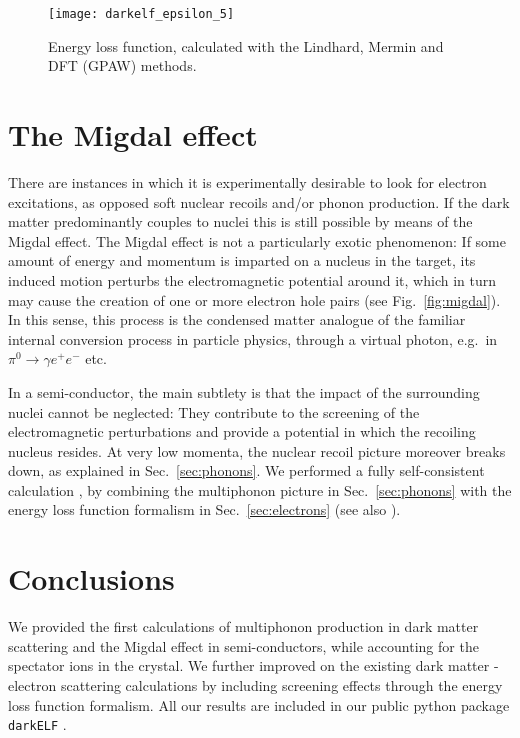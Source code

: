 \documentclass{moriond}
\begin{document}
\begin{figure}
\centerline{\texttt{[image: darkelf\_epsilon\_5]}}
\caption[]{Energy loss function, calculated with the Lindhard, Mermin and DFT (GPAW) methods.\cite{Knapen:2021run,Knapen:2021bwg}}
\label{fig:elf}
\end{figure}


\section{The Migdal effect}
There are instances in which it is experimentally desirable to look for electron excitations, as opposed soft nuclear recoils and/or phonon production. If the dark matter predominantly couples to nuclei this is still possible by means of the Migdal effect. The Migdal effect is not a particularly exotic phenomenon: If some amount of energy and momentum is imparted on a nucleus in the target, its induced motion perturbs the electromagnetic potential around it, which in turn may cause the creation of one or more electron hole pairs (see Fig.~\ref{fig:migdal}). In this sense, this process is the condensed matter analogue of the familiar internal conversion process in particle physics, through a virtual photon, e.g.~in $\pi^0 \to \gamma e^+e^-$ etc. 

In a semi-conductor, the main subtlety is that the impact of the surrounding nuclei cannot be neglected: They contribute to the screening of the electromagnetic perturbations and provide a potential in which the recoiling nucleus resides. At very low momenta, the nuclear recoil picture moreover breaks down, as explained in Sec.~\ref{sec:phonons}. We performed a fully self-consistent calculation \cite{Knapen:2020aky}, by combining the multiphonon picture in Sec.~\ref{sec:phonons} with the energy loss function formalism in Sec.~\ref{sec:electrons} (see also \cite{Liang:2020ryg,Berghaus:2022pbu}). 





\section{Conclusions}

We provided the first calculations of multiphonon production in dark matter scattering and the Migdal effect in semi-conductors, while accounting for the spectator ions in the crystal. We further improved on the existing dark matter - electron scattering calculations by including screening effects through the energy loss function formalism. All our results are included in our public python package \verb+darkELF+ \cite{Knapen:2021bwg,darkelf}.
\end{document}
